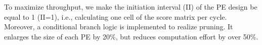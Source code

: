 To maximize throughput, we make the initiation interval (II) of the PE design be equal to 1 (II=1), i.e., calculating one cell of the score matrix per cycle. 
Moreover, a conditional branch logic is implemented to realize pruning. 
It enlarges the size of each PE by 20\%, but reduces computation effort by over 50\%.  
